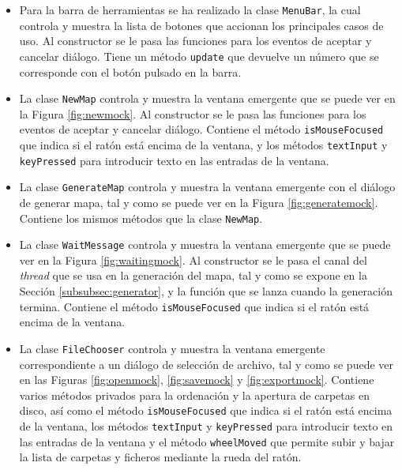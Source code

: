 \begin{itemize}
	\item Para la barra de herramientas se ha realizado la clase \texttt{MenuBar}, la cual controla y muestra la lista de botones que accionan los principales casos de uso. Al constructor se le pasa las funciones para los eventos de aceptar y cancelar diálogo. Tiene un método \texttt{update} que devuelve un número que se corresponde con el botón pulsado en la barra.
	\item La clase \texttt{NewMap} controla y muestra la ventana emergente que se puede ver en la Figura \ref{fig:newmock}. Al constructor se le pasa las funciones para los eventos de aceptar y cancelar diálogo. Contiene el método \texttt{isMouseFocused} que indica si el ratón está encima de la ventana, y los métodos \texttt{textInput} y \texttt{keyPressed} para introducir texto en las entradas de la ventana.
	\item La clase \texttt{GenerateMap} controla y muestra la ventana emergente con el diálogo de generar mapa, tal y como se puede ver en la Figura \ref{fig:generatemock}. Contiene los mismos métodos que la clase \texttt{NewMap}.
	\item La clase \texttt{WaitMessage} controla y muestra la ventana emergente que se puede ver en la Figura \ref{fig:waitingmock}. Al constructor se le pasa el canal del \textit{thread} que se usa en la generación del mapa, tal y como se expone en la Sección \ref{subsubsec:generator}, y la función que se lanza cuando la generación termina. Contiene el método \texttt{isMouseFocused} que indica si el ratón está encima de la ventana.
	\item La clase \texttt{FileChooser} controla y muestra la ventana emergente correspondiente a un diálogo de selección de archivo, tal y como se puede ver en las Figuras \ref{fig:openmock}, \ref{fig:savemock} y \ref{fig:exportmock}. Contiene varios métodos privados para la ordenación y la apertura de carpetas en disco, así como el método \texttt{isMouseFocused} que indica si el ratón está encima de la ventana, los métodos \texttt{textInput} y \texttt{keyPressed} para introducir texto en las entradas de la ventana y el método \texttt{wheelMoved} que permite subir y bajar la lista de carpetas y ficheros mediante la rueda del ratón.
\end{itemize}